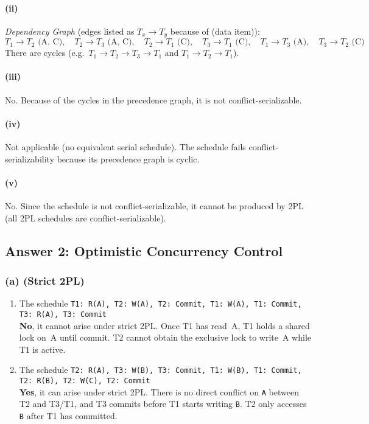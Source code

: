 \documentclass[11pt]{article}
\begin{document}
\paragraph{(ii)}
\emph{Dependency Graph} (edges listed as {\small $T_x \to T_y$ because of (data item)}):
\[
T_1 \to T_2 \text{ (A, C)}, \quad
T_2 \to T_3 \text{ (A, C)}, \quad
T_2 \to T_1 \text{ (C)}, \quad
T_3 \to T_1 \text{ (C)}, \quad 
T_1 \to T_3 \text{ (A)}, \quad
T_3 \to T_2 \text{ (C)}
\]
There are cycles (e.g.\ $T_1 \to T_2 \to T_3 \to T_1$ and $T_1 \to T_2 \to T_1$).

\paragraph{(iii)}
No. Because of the cycles in the precedence graph, it is not conflict-serializable.

\paragraph{(iv)}
Not applicable (no equivalent serial schedule). The schedule fails conflict-serializability because its precedence graph is cyclic.

\paragraph{(v)}
No. Since the schedule is not conflict-serializable, it cannot be produced by 2PL (all 2PL schedules are conflict-serializable).

\subsection*{Answer 2: Optimistic Concurrency Control}

\subsubsection*{(a) \; (Strict 2PL)}
\begin{enumerate}
  \item The schedule \texttt{T1: R(A), T2: W(A), T2: Commit, T1: W(A), T1: Commit, T3: R(A), T3: Commit} \\
  \textbf{No}, it cannot arise under strict 2PL. Once T1 has read~A, T1 holds a shared lock on~A until commit. T2 cannot obtain the exclusive lock to write~A while T1 is active.

  \item The schedule \texttt{T2: R(A), T3: W(B), T3: Commit, T1: W(B), T1: Commit, T2: R(B), T2: W(C), T2: Commit} \\
  \textbf{Yes}, it can arise under strict 2PL. There is no direct conflict on \texttt{A} between T2 and T3/T1, and T3 commits before T1 starts writing \texttt{B}. T2 only accesses \texttt{B} after T1 has committed.
\end{enumerate}
\end{document}

